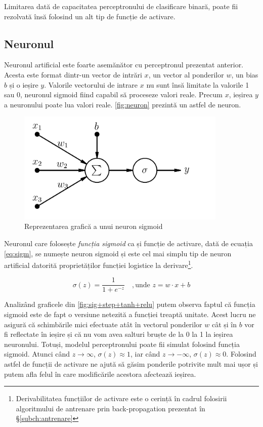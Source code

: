 Limitarea dată de capacitatea perceptronului de clasificare binară, poate fii rezolvată însă folosind un alt tip de funcție de activare. 

\subsection{Neuronul}\label{subch:neuronul}
Neuronul artificial este foarte asemănător cu perceptronul prezentat anterior. Acesta este format dintr-un vector de intrări $x$, un vector al ponderilor $w$, un bias $b$ și o ieșire $y$. Valorile vectorului de intrare $x$ nu sunt însă limitate la valorile 1 sau 0, neuronul sigmoid fiind capabil să proceseze valori reale. Precum $x$, ieșirea $y$ a neuronului poate lua valori reale. \autoref{fig:neuron} prezintă un astfel de neuron.
\begin{figure}[ht]
\centering
\includegraphics[width=10cm,keepaspectratio]{fig/cap2/artificial-neuron.png}
\caption{Reprezentarea grafică a unui neuron sigmoid}\label{fig:neuron}
\end{figure}

Neuronul care folosește \textit{funcția sigmoid} ca și funcție de activare, dată de ecuația \eqref{eq:sigm}, se numește neuron sigmoid și este cel mai simplu tip de neuron artificial datorită proprietăților funcției logistice la derivare\footnote{Derivabilitatea funcțiilor de activare este o cerință în cadrul folosirii algoritmului de antrenare prin back-propagation prezentat în \S\ref{subch:antrenare}}.

\begin{equation}
\sigma(z) = \frac{1}{1+e^{-z}} \quad,\text{unde }z= w\cdot x + b
\label{eq:sigm}
\end{equation}

Analizând graficele din \autoref{fig:sig+step+tanh+relu} putem observa faptul că funcția sigmoid este de fapt o versiune netezită a funcției treaptă unitate. Acest lucru ne asigură că schimbările mici efectuate atât în vectorul ponderilor $w$ cât și în $b$ vor fi reflectate în ieșire și că nu vom avea salturi bruște de la 0 la 1 la ieșirea neuronului.
Totuși, modelul perceptronului poate fii simulat folosind funcția sigmoid. Atunci când $z\rightarrow\infty$, $\sigma(z)\approx 1$, iar când $z\rightarrow-\infty$, $\sigma(z)\approx 0$. Folosind astfel de funcții de activare ne ajută să găsim ponderile potrivite mult mai ușor și putem afla felul în care modificările acestora afectează ieșirea.

